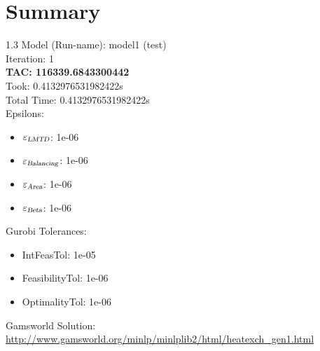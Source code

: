 \documentclass{article}%
\begin{document}
%
\normalsize%
\section{Summary}%
\thispagestyle{plain}%
\begin{spacing}{1.3}%
\Large%
Model (Run-name): model1 (test)\\%
Iteration: 1\\%
\textbf{TAC: 116339.6843300442}\\%
Took: 0.4132976531982422s\\%
Total Time: 0.4132976531982422s\\%
Epsilons:%
\begin{itemize}%
	\item $\varepsilon_{\textsl{LMTD}}$: 1e-06%
	\item $\varepsilon_{\textsl{Balancing}}$: 1e-06%
	\item $\varepsilon_{\textsl{Area}}$: 1e-06%
	\item $\varepsilon_{\textsl{Beta}}$: 1e-06%
\end{itemize}%
Gurobi Tolerances:%
\begin{itemize}%
	\item IntFeasTol: 1e-05%
	\item FeasibilityTol: 1e-06%
	\item OptimalityTol: 1e-06%
\end{itemize}%
\end{spacing}%
\normalsize%
Gamsworld Solution: \url{http://www.gamsworld.org/minlp/minlplib2/html/heatexch_gen1.html}%
%
\clearpage%
\end{document}

